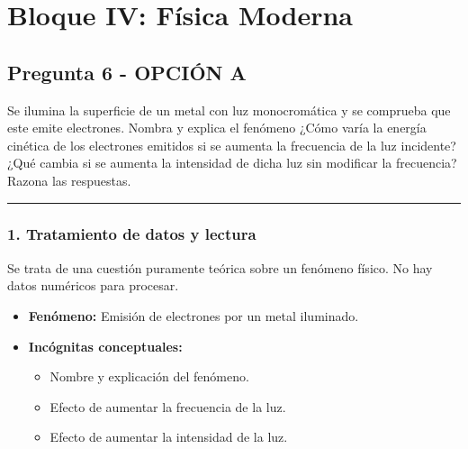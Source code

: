 \newpage

\section{Bloque IV: Física Moderna}
\label{sec:fis_mod_2025_jul_ord}

\subsection{Pregunta 6 - OPCIÓN A}
\label{subsec:6A_2025_jul_ord}

\begin{cajaenunciado}
Se ilumina la superficie de un metal con luz monocromática y se comprueba que este emite electrones. Nombra y explica el fenómeno ¿Cómo varía la energía cinética de los electrones emitidos si se aumenta la frecuencia de la luz incidente? ¿Qué cambia si se aumenta la intensidad de dicha luz sin modificar la frecuencia? Razona las respuestas.
\end{cajaenunciado}
\hrule

\subsubsection*{1. Tratamiento de datos y lectura}
Se trata de una cuestión puramente teórica sobre un fenómeno físico. No hay datos numéricos para procesar.
\begin{itemize}
    \item \textbf{Fenómeno:} Emisión de electrones por un metal iluminado.
    \item \textbf{Incógnitas conceptuales:}
    \begin{itemize}
        \item Nombre y explicación del fenómeno.
        \item Efecto de aumentar la frecuencia de la luz.
        \item Efecto de aumentar la intensidad de la luz.
    \end{itemize}
\end{itemize}

